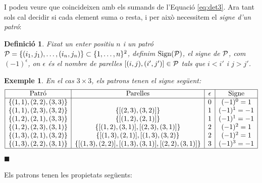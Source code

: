 \documentclass[
  11pt,
]{book}
\numberwithin{dummy}{section}
\theoremstyle{maincolornumbox}
\theoremstyle{blacknumex}
\newtheorem{exampleT}{Exemple}[chapter]
\theoremstyle{blacknumbox}
\newtheorem{definitionT}{Definició}[chapter]
\theoremstyle{maincolornum}
\newenvironment{definition}{\begin{dBox}\begin{definitionT}}{\end{definitionT}\end{dBox}}
\newenvironment{example}{\begin{exampleT}}{\hfill{\tiny\ensuremath{\blacksquare}}\end{exampleT}}
\begin{document}
I podeu veure que coincideixen amb els sumands de l'Equació
\eqref{eq:det3}. Ara
tant sols cal decidir si cada element suma o resta, i per això
necessitem el \emph{signe d'un patró}:

\begin{definition}
\protect\hypertarget{def:signepatro}{}\label{def:signepatro}Fixat un enter positiu \(n\) i
un patró \(\mathcal{P}=\{(i_1,j_1),\dots,(i_n,j_n)\}\subset \{1,\dots,n\}^2\),
definim \(\operatorname{Sign}(\mathcal{P})\), el \emph{signe de \(\mathcal{P}\)}, com \((-1)^\epsilon\), on
\(\epsilon\) és el nombre de parelles \([(i,j),(i',j')]\in\mathcal{P}\) tals que
\(i<i'\) i \(j>j'\).
\end{definition}

\begin{example}
En el cas \(3\times 3\), els patrons tenen el signe següent:
\[\begin{array}{|c|c|c|c|}
    \hline \text{Patró} & \text{Parelles} & \epsilon & \text{Signe} \\ \hline
    \{(1,1),(2,2),(3,3)\} & & 0 & (-1)^0=1 \\
    \{(1,1),(2,3),(3,2)\} & \{[(2,3),(3,2)]\} & 1 & (-1)^1=-1 \\
    \{(1,2),(2,1),(3,3)\} & \{[(1,2),(2,1)]\} & 1 & (-1)^1=-1 \\
    \{(1,2),(2,3),(3,1)\} & \{[(1,2),(3,1)],[(2,3),(3,1)]\} & 2 & (-1)^2=1 \\
    \{(1,3),(2,1),(3,2)\} & \{[(1,3),(2,1)],[(1,3),(3,2)\} & 2 & (-1)^2=1 \\
    \{(1,3),(2,2),(3,1)\} & \{[(1,3),(2,2)],[(1,3),(3,1)],[(2,2),(3,1)]\} & 3 & (-1)^3=-1 \\ \hline
    \end{array}\]
\end{example}

Els patrons tenen les propietats següents:
\end{document}
